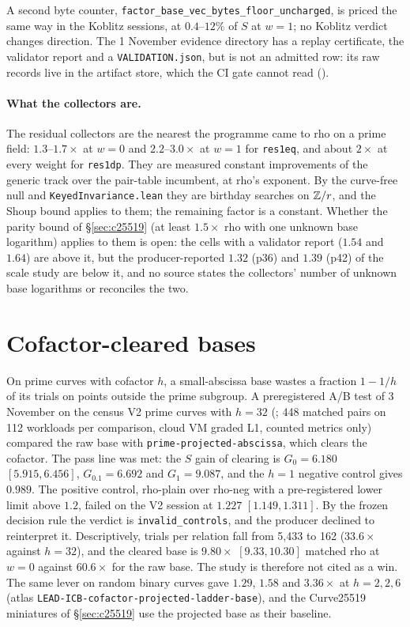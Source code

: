 A second byte counter, \texttt{factor\_base\_vec\_bytes\_floor\_uncharged},
is priced the same way in the Koblitz sessions, at $0.4$--$12\%$ of $S$ at
$w=1$; no Koblitz verdict changes direction. The 1 November evidence
directory has a replay certificate, the validator report and a
\texttt{VALIDATION.json}, but is not an admitted row: its raw records live
in the artifact store, which the CI gate cannot read
().

\paragraph{What the collectors are.} The residual collectors are the
nearest the programme came to rho on a prime field: $1.3$--$1.7\times$ at
$w=0$ and $2.2$--$3.0\times$ at $w=1$ for \texttt{res1eq}, and about
$2\times$ at every weight for \texttt{res1dp}. They are measured constant
improvements of the generic track over the pair-table incumbent, at rho's
exponent. By the curve-free null and \texttt{KeyedInvariance.lean} they
are birthday searches on $\mathbb{Z}/r$, and the Shoup bound applies to them; the
remaining factor is a constant. Whether the parity bound of
\S\ref{sec:c25519} (at least $1.5\times$ rho with one unknown base
logarithm) applies to them is open: the cells with a validator report
($1.54$ and $1.64$) are above it, but the producer-reported $1.32$ (p36) and
$1.39$ (p42) of the scale study are below it, and no source states the
collectors' number of unknown base logarithms or reconciles the two.

\section{Cofactor-cleared bases}\label{sec:pg-cofactor}

On prime curves with cofactor $h$, a small-abscissa base wastes a fraction
$1-1/h$ of its trials on points outside the prime subgroup. A preregistered
A/B test of 3 November on the census V2 prime curves with $h=32$
(; 448 matched pairs on 112
workloads per comparison, cloud VM graded L1, counted metrics only) compared
the raw base with \texttt{prime-projected-abscissa}, which clears the
cofactor. The pass line was met: the $S$ gain of clearing is $G_0=6.180$
$[5.915,6.456]$, $G_{0.1}=6.692$ and $G_1=9.087$, and the $h=1$ negative
control gives $0.989$. The positive control, rho-plain over rho-neg with a
pre-registered lower limit above $1.2$, failed on the V2 session at
$1.227$ $[1.149,1.311]$. By the frozen decision rule the verdict is
\texttt{invalid\_controls}, and the producer declined to reinterpret it.
Descriptively, trials per relation fall from 5{,}433 to 162 ($33.6\times$
against $h=32$), and the cleared base is $9.80\times$ $[9.33,10.30]$ matched
rho at $w=0$ against $60.6\times$ for the raw base. The study is therefore
not cited as a win. The same lever on random binary curves gave
$1.29$, $1.58$ and $3.36\times$ at $h=2,2,6$ (atlas
\texttt{LEAD-ICB-cofactor-projected-ladder-base}), and the Curve25519
miniatures of \S\ref{sec:c25519} use the projected base as their baseline.

